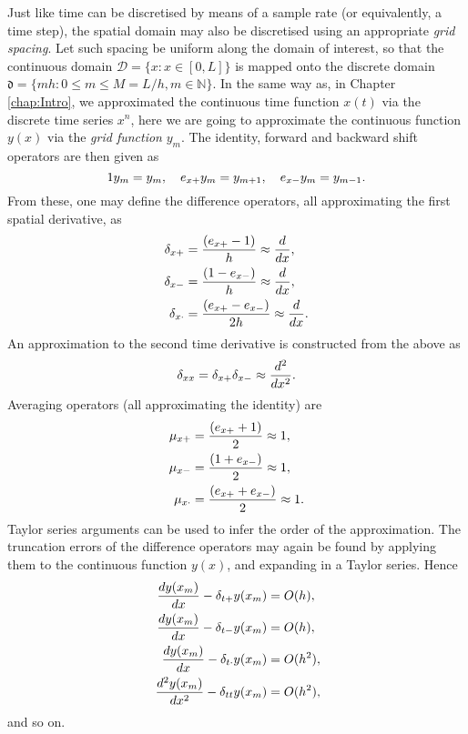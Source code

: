 Just like time can be discretised by means of a sample rate (or equivalently, a time step), the spatial domain may also be discretised using an appropriate \emph{grid spacing}. Let such spacing be uniform along the domain of interest, so that the continuous domain $\mathcal{D} = \{ x : x \in [0,L]\}$ is mapped onto the discrete domain $\mathfrak{d} = \{ mh : 0 \leq m \leq M = L/h, m \in {\mathbb N}\}$. In the same way as, in Chapter \ref{chap:Intro}, we approximated the continuous time function $x(t)$ via the discrete time series $x^n$, here we are going to approximate the continuous function $y(x)$ via the \emph{grid function} $y_m$. The identity, forward and backward shift operators are then given as
\begin{equation}
    {1}{y}_m = {y}_m, \quad e_{x+} {y}_m = {y}_{m+1}, \quad e_{x-} {y}_m = {y}_{m-1}.
\end{equation}
From these, one may define the difference operators, all approximating the first spatial derivative, as
\begin{subequations}
    \begin{align}
        \delta_{x+} & = \frac{(e_{x+} - 1)}{h} \approx \frac{d}{dx},     \\ 
        \delta_{x-} & = \frac{(1 - e_{x-})}{h}\approx \frac{d}{dx},      \\ 
        \delta_{x\cdot} & = \frac{(e_{x+} - e_{x-})}{2h}\approx \frac{d}{dx} . 
    \end{align}
\end{subequations}
An approximation to the second time derivative is constructed from the above as
\begin{equation}
    \delta_{xx}  = \delta_{x+}\delta_{x-}\approx \frac{d^2}{dx^2}.
\end{equation}
Averaging operators (all approximating the identity) are
\begin{subequations}
    \begin{align}
        \mu_{x+} & = \frac{(e_{x+} + 1)}{2} \approx 1,    \\ 
        \mu_{x-} & = \frac{(1 + e_{x-})}{2} \approx 1,    \\ 
        \mu_{x\cdot}& = \frac{(e_{x+} + e_{x-})}{2} \approx 1. 
    \end{align}
\end{subequations}
Taylor series arguments can be used to infer the order of the approximation. The truncation errors of the difference operators may again be found by applying them to the continuous function $y(x)$, and expanding in a Taylor series. Hence
\begin{subequations}\label{eq:ErrsSpatial}
\begin{align}\
     \frac{dy(x_m)}{dx} - \delta_{t+} y(x_m) &= O(h), \\
     \frac{dy(x_m)}{dx} - \delta_{t-} y(x_m) &= O(h), \\   
     \frac{dy(x_m)}{dx} - \delta_{t\cdot} y(x_m) &= O(h^2),\\   
     \frac{d^2y(x_m)}{dx^2} - \delta_{tt} y(x_m) &= O(h^2),
\end{align}
\end{subequations}
and so on. 



